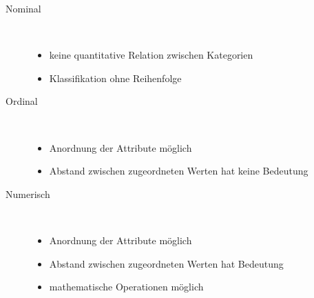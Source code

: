 	\begin{description}
		\item[Nominal] \ \\\vspace*{-\baselineskip}
			\begin{itemize}
				\item keine quantitative Relation zwischen Kategorien
				\item Klassifikation ohne Reihenfolge
			\end{itemize}
		\item[Ordinal] \ \\\vspace*{-\baselineskip}
			\begin{itemize}
				\item Anordnung der Attribute möglich
				\item Abstand zwischen zugeordneten Werten hat keine Bedeutung
			\end{itemize}
		\item[Numerisch] \ \\\vspace*{-\baselineskip}
			\begin{itemize}
				\item Anordnung der Attribute möglich
				\item Abstand zwischen zugeordneten Werten hat Bedeutung
				\item mathematische Operationen möglich
			\end{itemize}
	\end{description}
